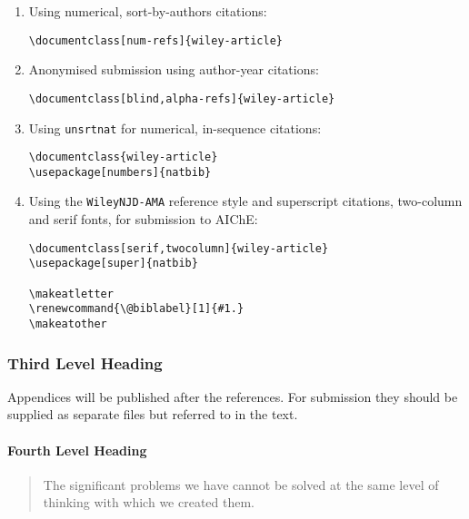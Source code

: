 \begin{enumerate}
       \item Using numerical, sort-by-authors citations:
             \begin{verbatim}
\documentclass[num-refs]{wiley-article}
\end{verbatim}

       \item Anonymised submission using author-year citations:
             \begin{verbatim}
\documentclass[blind,alpha-refs]{wiley-article}
\end{verbatim}

       \item Using \texttt{unsrtnat} for numerical, in-sequence citations:
             \begin{verbatim}
\documentclass{wiley-article}
\usepackage[numbers]{natbib}

\end{verbatim}

       \item Using the \texttt{WileyNJD-AMA} reference style and superscript citations, two-column and serif fonts, for submission to AIChE:

             \begin{verbatim}
\documentclass[serif,twocolumn]{wiley-article}
\usepackage[super]{natbib}

\makeatletter
\renewcommand{\@biblabel}[1]{#1.}
\makeatother
\end{verbatim}

\end{enumerate}

\subsubsection{Third Level Heading}

Appendices will be published after the references. For submission they should be supplied as separate files but referred to in the text.

\paragraph{Fourth Level Heading}
\begin{quote}
       The significant problems we have cannot be solved at the same level of thinking with which we created them.
\end{quote}

